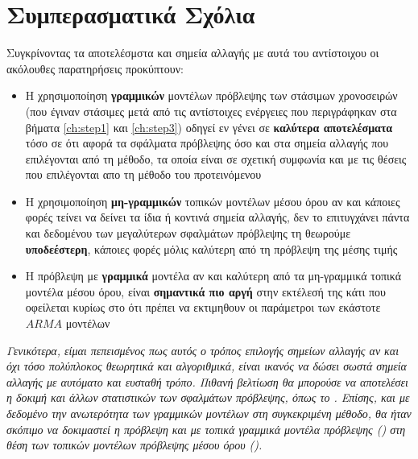 \chapter{Συμπερασματικά Σχόλια}
\label{ch:step7}
\thispagestyle{fancy}

Συγκρίνοντας τα αποτελέσμστα και σημεία αλλαγής με αυτά του αντίστοιχου  οι ακόλουθες παρατηρήσεις προκύπτουν:
\begin{itemize}
    \item Η χρησιμοποίηση \textbf{γραμμικών} μοντέλων πρόβλεψης των στάσιμων χρονοσειρών (που έγιναν στάσιμες μετά από τις αντίστοιχες ενέργειες που περιγράφηκαν στα βήματα \ref{ch:step1} και \ref{ch:step3}) οδηγεί εν γένει σε \textbf{καλύτερα αποτελέσματα} τόσο σε ότι αφορά τα σφάλματα πρόβλεψης όσο και στα σημεία αλλαγής που επιλέγονται από τη μέθοδο, τα οποία είναι σε σχετική συμφωνία και με τις θέσεις που επιλέγονται απο τη μέθοδο του προτεινόμενου 
    \item Η χρησιμοποίηση \textbf{μη-γραμμικών} τοπικών μοντέλων μέσου όρου αν και κάποιες φορές τείνει να δείνει τα ίδια ή κοντινά σημεία αλλαγής, δεν το επιτυγχάνει πάντα και δεδομένου των μεγαλύτερων σφαλμάτων πρόβλεψης τη θεωρούμε \textbf{υποδεέστερη}, κάποιες φορές μόλις καλύτερη από τη πρόβλεψη της μέσης τιμής
    \item Η πρόβλεψη με \textbf{γραμμικά} μοντέλα αν και καλύτερη από τα μη-γραμμικά τοπικά μοντέλα μέσου όρου, είναι \textbf{σημαντικά πιο αργή} στην εκτέλεσή της κάτι που οφείλεται κυρίως στο ότι πρέπει να εκτιμηθουν οι παράμετροι των εκάστοτε $ARMA$ μοντέλων
\end{itemize}

\textit{Γενικότερα, είμαι πεπεισμένος πως αυτός ο τρόπος επιλογής σημείων αλλαγής αν και όχι τόσο πολύπλοκος θεωρητικά και αλγοριθμικά, είναι ικανός να δώσει σωστά σημεία αλλαγής με αυτόματο και ευσταθή τρόπο. Πιθανή βελτίωση θα μπορούσε να αποτελέσει η δοκιμή και άλλων στατιστικών των σφαλμάτων πρόβλεψης, όπως το . Επίσης, και με δεδομένο την ανωτερότητα των γραμμικών μοντέλων στη συγκεκριμένη μέθοδο, θα ήταν σκόπιμο να δοκιμαστεί η πρόβλεψη και με τοπικά γραμμικά μοντέλα πρόβλεψης () στη θέση των τοπικών μοντέλων πρόβλεψης μέσου όρου ().}